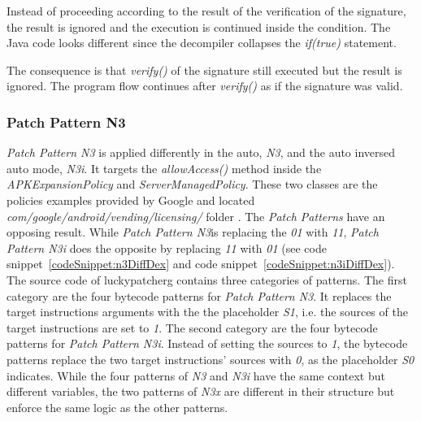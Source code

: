 Instead of proceeding according to the result of the verification of the signature, the result is ignored and the execution is continued inside the condition.
The Java code looks different since the decompiler collapses the \textit{if(true)} statement.
\newline

The consequence is that \textit{verify()} of the signature still executed but the result is ignored.
The program flow continues after  \textit{verify()} as if the signature was valid.

\subsubsection{Patch Pattern N3}
\textit{Patch Pattern N3} is applied differently in the auto, \textit{N3}, and the auto inversed auto mode, \textit{N3i}.
It targets the \textit{allowAccess()} method inside the \textit{APKExpansionPolicy} and \textit{ServerManagedPolicy}.
These two classes are the policies examples provided by Google and located \textit{com/google/android/vending/licensing/} folder \cite{developersLicensingReference}.
\newline
The \textit{Patch Patterns} have an opposing result.
While \textit{Patch Pattern N3}is replacing the \textit{01} with \textit{11}, \textit{Patch Pattern N3i} does the opposite by replacing \textit{11} with \textit{01} (see code snippet~\ref{codeSnippet:n3DiffDex} and code snippet~\ref{codeSnippet:n3iDiffDex}).
\newline
The source code of \gls{luckypatcherg} contains three categories of patterns.
The first category are the four bytecode patterns for \textit{Patch Pattern N3}.
It replaces the target instructions arguments with the the placeholder \textit{S1}, i.e. the sources of the target instructions are set to \textit{1}.
\newline
The second category are the four bytecode patterns for \textit{Patch Pattern N3i}.
Instead of setting the sources to \textit{1}, the bytecode patterns replace the two target instructions' sources with \textit{0}, as the placeholder \textit{S0} indicates.
\newline
While the four patterns of \textit{N3} and \textit{N3i} have the same context but different variables, the two patterns of \textit{N3x} are different in their structure but enforce the same logic as the other patterns.
